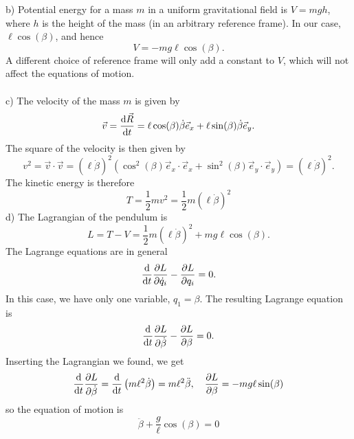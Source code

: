 \documentclass{article}
\begin{document}
        b) Potential energy for a mass $m$ in a uniform gravitational field is $V = mgh$, where $h$ is the height of the mass (in an arbitrary reference frame). In our case, $\ell \cos(\beta)$, and hence
        \begin{equation*}
            V = - m g \ell \cos(\beta).
        \end{equation*}
        A different choice of reference frame will only add a constant to $V$, which will not affect the equations of motion. \\ \\
        c) The velocity of the mass $m$ is given by
        \begin{equation*}
            \vec v = \dv{\vec R}{t} = \ell \cos(\beta) \dot \beta \vec e_x + \ell \sin(\beta) \dot \beta \vec e_y.
        \end{equation*}
        The square of the velocity is then given by
        \begin{equation*}
            v^2 = \vec v \cdot \vec v = (\ell \dot \beta)^2 (\cos^2(\beta) \vec e_x \cdot \vec e_x + \sin^2(\beta) \vec e_y \cdot \vec e_y ) = (\ell \dot \beta)^2.
        \end{equation*}
        The kinetic energy is therefore 
        \begin{equation*}
            T = \frac{1}{2} m v^2 = \frac{1}{2}m (\ell \dot \beta)^2  
        \end{equation*}
        d) The Lagrangian of the pendulum is 
        \begin{equation*}
            L = T - V = \frac{1}{2}m (\ell \dot \beta)^2  + m g \ell \cos(\beta).
        \end{equation*}
        The Lagrange equations are in general
        \begin{equation*}
            \dv{t} \pdv{L}{\dot q_i} - \pdv{L}{q_i} = 0.
        \end{equation*}
        In this case, we have only one variable, $q_1 = \beta$. The resulting Lagrange equation is 
        \begin{equation*}
            \dv{t} \pdv{L}{\dot \beta} - \pdv{L}{\beta} = 0.
        \end{equation*}
        Inserting the Lagrangian we found, we get
        \begin{align*}
            \dv{t}\pdv{L}{\dot \beta} 
            = \dv{t} \left( m \ell^2 \dot \beta \right) 
            = m \ell^2 \ddot \beta, 
            \quad \pdv{L}{\beta} = - m g \ell \sin(\beta)    
        \end{align*}
        so the equation of motion is
        \begin{equation*}
            \ddot \beta + \frac{g}{\ell} \cos(\beta) = 0
        \end{equation*}
\end{document}
